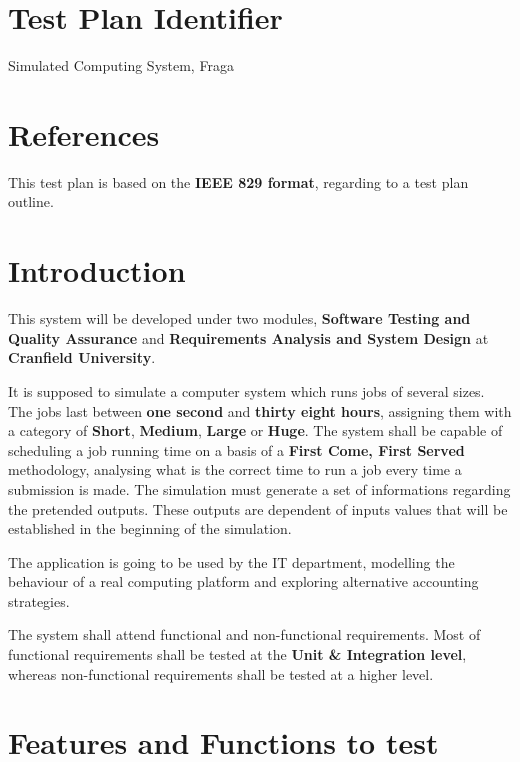 \documentclass[12pt]{article}
\begin{document}
\section*{Test Plan Identifier}

Simulated Computing System, Fraga

\section*{References}

This test plan is based on the \textbf{IEEE 829 format}, regarding to a test plan outline. 


\section*{Introduction}
\par This system will be developed under two modules, \textbf{Software Testing and Quality Assurance} and  \textbf{Requirements Analysis and System Design} at \textbf{Cranfield University}. 
\par It is supposed to simulate a computer system which runs jobs of several sizes. The jobs last between \textbf{one second} and \textbf{thirty eight hours}, assigning them with a category of \textbf{Short}, \textbf{Medium}, \textbf{Large} or \textbf{Huge}. The system shall be capable of scheduling a job running time on a basis of a \textbf{First Come, First Served} methodology, analysing what is the correct time to run a job every time a submission is made. The simulation must generate a set of informations regarding the pretended outputs. These outputs are dependent of inputs values that will be established in the beginning of the simulation.


\par The application is going to be used by the IT department, modelling the behaviour of a real computing platform and exploring alternative accounting strategies.

\par The system shall attend functional and non-functional requirements. Most of functional requirements shall be tested at the \textbf{Unit \& Integration level}, whereas non-functional requirements shall be tested at a higher level.

\section*{Features and Functions to test}
\end{document}
